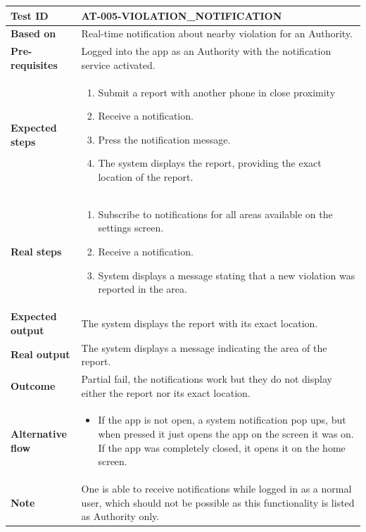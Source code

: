 \begin{table}[H]
    \centering
    \begin{tabular}{p{3cm}p{10cm}}
    \textbf{Test ID} & AT-005-VIOLATION\_NOTIFICATION \\ \hline
    \textbf{Based on} & Real-time notiﬁcation about nearby violation for an Authority. \\ \hline
    \textbf{Pre-requisites} & Logged into the app as an Authority with the notification service activated. \\ \hline
    \textbf{Expected steps} & 
        \begin{enumerate} \itemsep0em
            \item Submit a report with another phone in close proximity
            \item Receive a notification.
            \item Press the notification message.
            \item The system displays the report, providing the exact location of the report.
        \end{enumerate} \\ \hline
    \textbf{Real steps} & 
        \begin{enumerate} \itemsep0em
            \item Subscribe to notifications for all areas available on the settings screen.
            \item Receive a notification.
            \item System displays a message stating that a new violation was reported in the area.
        \end{enumerate} \\ \hline
    \textbf{Expected output} & The system displays the report with its exact location. \\ \hline
    \textbf{Real output} & The system displays a message indicating the area of the report. \\ \hline
    \textbf{Outcome} & Partial fail, the notifications work but they do not display either the report nor its exact location. \\ \hline
    \textbf{Alternative flow} & 
        \begin{itemize} \itemsep0em
            \item If the app is not open, a system notification pop ups, but when pressed it just opens the app on the screen it was on. If the app was completely closed, it opens it on the home screen.
        \end{itemize} \\ \hline
    \textbf{Note} & One is able to receive notifications while logged in as a normal user, which should not be possible as this functionality is listed as Authority only. \\ \hline
    \end{tabular}
\end{table}


